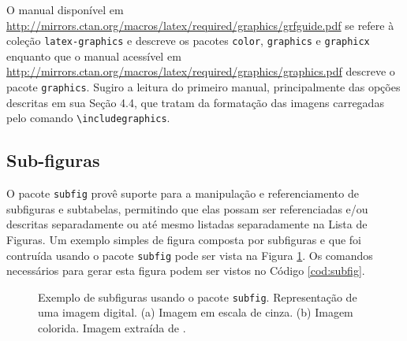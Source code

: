 O manual disponível em  \url{http://mirrors.ctan.org/macros/latex/required/graphics/grfguide.pdf} \parencite{graphicsguide} se refere à coleção \texttt{latex-graphics} e descreve os pacotes \texttt{color}, \texttt{graphics} e \texttt{graphicx} enquanto que o manual acessível em \url{http://mirrors.ctan.org/macros/latex/required/graphics/graphics.pdf} \parencite{graphics} descreve o pacote \texttt{graphics}. Sugiro a leitura do primeiro manual, principalmente das opções descritas em sua Seção 4.4, que tratam da formatação das imagens carregadas pelo comando \texttt{\textbackslash{}includegraphics}.

\subsection{Sub-figuras}

O pacote \texttt{subfig} provê suporte para a manipulação e referenciamento de subfiguras e subtabelas, permitindo que elas possam ser referenciadas e/ou descritas separadamente ou até mesmo listadas separadamente na Lista de Figuras. Um exemplo simples de figura composta por subfiguras e que foi contruída usando o pacote \texttt{subfig} pode ser vista na Figura \ref{fig:subfig}. Os comandos necessários para gerar esta figura podem ser vistos no Código \ref{cod:subfig}.

\begin{figure}[ht]
    \centering
    \caption{Exemplo de subfiguras usando o pacote \texttt{subfig}. Representação de uma imagem digital. (a) Imagem em escala de cinza. (b) Imagem colorida. Imagem extraída de \parencite{Barbosa2020}.}
    \label{fig:subfig}
\end{figure}

